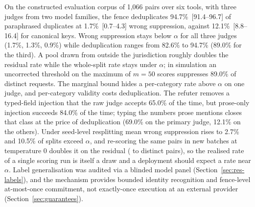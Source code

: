 On the constructed evaluation corpus of 1,066 pairs over six tools, with three judges from two model families, the fence deduplicates 94.7\%~[91.4--96.7] of paraphrased duplicates at 1.7\%~[0.7--4.3] wrong suppression, against 12.1\%~[8.8--16.4] for canonical keys. Wrong suppression stays below $\alpha$ for all three judges (1.7\%, 1.3\%, 0.9\%) while deduplication ranges from 82.6\% to 94.7\% (89.0\% for the third). A pool drawn from outside the jurisdiction roughly doubles the residual rate while the whole-split rate stays under $\alpha$; in simulation an uncorrected threshold on the maximum of $m=50$ scores suppresses 89.0\% of distinct requests. The marginal bound hides a per-category rate above $\alpha$ on one judge, and per-category validity costs deduplication. The refuter removes a typed-field injection that the raw judge accepts 65.0\% of the time, but prose-only injection succeeds 84.0\% of the time; typing the numbers prose mentions closes that class at the price of deduplication (69.0\% on the primary judge, 12.1\% on the others). Under seed-level resplitting mean wrong suppression rises to 2.7\% and 10.5\% of splits exceed $\alpha$, and re-scoring the same pairs in new batches at temperature 0 doubles it on the residual (\mclMOnePersistedCount{} to \mclMOneFreshCount{} distinct pairs), so the realised rate of a single scoring run is itself a draw and a deployment should expect a rate near $\alpha$. Label generalisation was audited via a blinded model panel (Section~\ref{sec:res-labels}), and the mechanism provides bounded identity recognition and fence-level at-most-once commitment, not exactly-once execution at an external provider (Section~\ref{sec:guarantees}).

